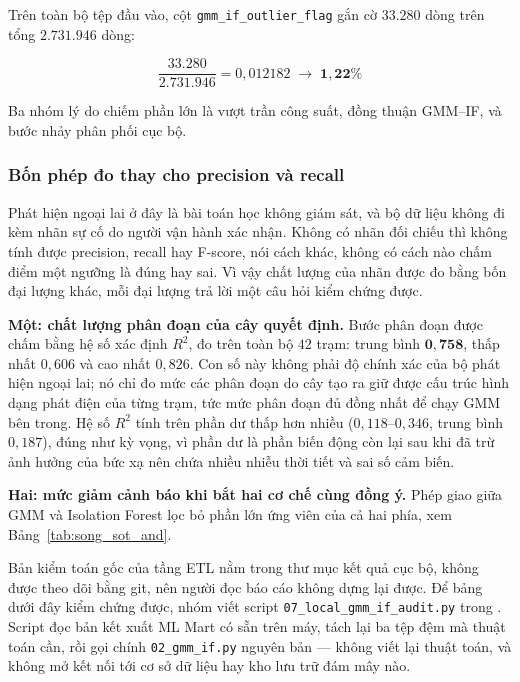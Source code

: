 Trên toàn bộ tệp đầu vào, cột \texttt{gmm\_if\_outlier\_flag} gắn cờ $\mathbf{33.280}$ dòng trên
tổng $\mathbf{2.731.946}$ dòng:

\begin{equation}
\frac{33.280}{2.731.946} = 0{,}012182 \;\longrightarrow\; \mathbf{1{,}22\%}
\end{equation}

Ba nhóm lý do chiếm phần lớn là vượt trần công suất, đồng thuận GMM--IF, và bước nhảy phân
phối cục bộ.

\subsubsection{Bốn phép đo thay cho precision và recall}

Phát hiện ngoại lai ở đây là bài toán học không giám sát, và bộ dữ liệu không đi
kèm nhãn sự cố do người vận hành xác nhận. Không có nhãn đối chiếu thì không tính được
precision, recall hay F-score, nói cách khác, không có cách nào chấm điểm một ngưỡng là
đúng hay sai. Vì vậy chất lượng của nhãn được đo bằng bốn đại lượng khác, mỗi đại lượng trả
lời một câu hỏi kiểm chứng được.

\textbf{Một: chất lượng phân đoạn của cây quyết định.} Bước phân đoạn được chấm bằng hệ
số xác định $R^2$, đo trên toàn bộ $42$ trạm: trung bình $\mathbf{0{,}758}$, thấp nhất
$0{,}606$ và cao nhất $0{,}826$. Con số này không phải độ chính xác của bộ phát
hiện ngoại lai; nó chỉ đo mức các phân đoạn do cây tạo ra giữ được cấu trúc hình dạng phát
điện của từng trạm, tức mức phân đoạn đủ đồng nhất để chạy GMM bên trong. Hệ số $R^2$ tính
trên phần dư thấp hơn nhiều ($0{,}118$--$0{,}346$, trung bình $0{,}187$), đúng như kỳ vọng,
vì phần dư là phần biến động còn lại sau khi đã trừ ảnh hưởng của bức xạ nên chứa nhiều
nhiễu thời tiết và sai số cảm biến.

\textbf{Hai: mức giảm cảnh báo khi bắt hai cơ chế cùng đồng ý.} Phép giao giữa GMM và
Isolation Forest lọc bỏ phần lớn ứng viên của cả hai phía, xem Bảng~\ref{tab:song_sot_and}.

Bản kiểm toán gốc của tầng ETL nằm trong thư mục kết quả cục bộ, không được theo dõi bằng
git, nên người đọc báo cáo không dựng lại được. Để bảng dưới đây kiểm chứng được, nhóm viết
script \texttt{07\_local\_gmm\_if\_audit.py} trong .
Script đọc bản kết xuất ML Mart có sẵn trên máy, tách lại ba tệp đệm mà thuật toán cần, rồi
gọi chính \texttt{02\_gmm\_if.py} nguyên bản --- không viết lại thuật toán, và không mở kết nối
tới cơ sở dữ liệu hay kho lưu trữ đám mây nào.

